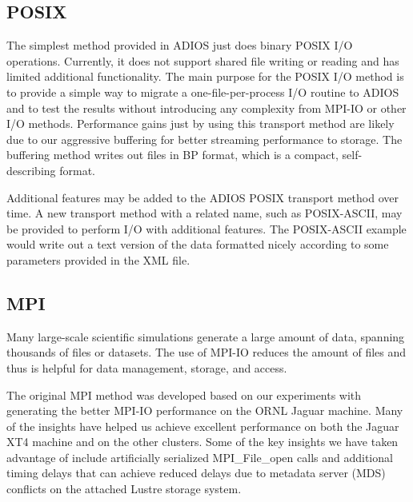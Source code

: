 \subsection{POSIX}

The simplest method provided in ADIOS just does binary POSIX I/O operations. Currently, 
it does not support shared file writing or reading and has limited additional functionality. 
The main purpose for the POSIX I/O method is to provide a simple way to migrate 
a one-file-per-process I/O routine to ADIOS and to test the results without introducing 
any complexity from MPI-IO or other I/O methods. Performance gains just by using 
this transport method are likely due to our aggressive buffering for better streaming 
performance to storage. The buffering method writes out files in BP format, which 
is a compact, self-describing format. 

Additional features may be added to the ADIOS POSIX transport method over time. 
A new transport method with a related name, such as POSIX-ASCII, may be provided 
to perform I/O with additional features. The POSIX-ASCII example would write out 
a text version of the data formatted nicely according to some parameters provided 
in the XML file.

\subsection{MPI}

Many large-scale scientific simulations generate a large amount of data, spanning 
thousands of files or datasets. The use of MPI-IO reduces the amount of files and 
thus is helpful for data management, storage, and access. 

The original MPI method was developed based on our experiments with generating 
the better MPI-IO performance on the ORNL Jaguar machine. Many of the insights 
have helped us achieve excellent performance on both the Jaguar XT4 machine and 
on the other clusters. Some of the key insights we have taken advantage of include 
artificially serialized MPI\_File\_open calls and additional timing delays that 
can achieve reduced delays due to metadata server (MDS) conflicts on the attached 
Lustre storage system.

